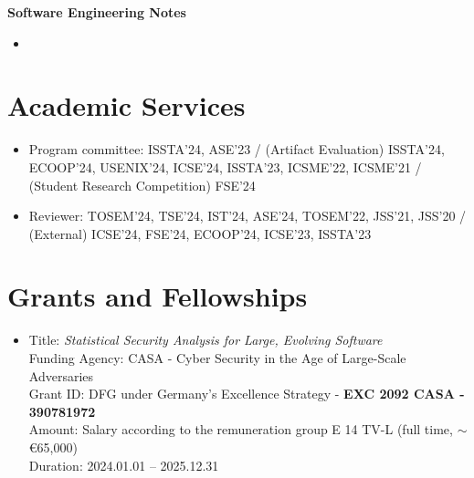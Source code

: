 \documentclass[letterpaper,11pt]{article}
\begin{document}
\textbf{Software Engineering Notes}\vspace{-4pt}
\begin{itemize}
  \item {}
\end{itemize}

\section{Academic Services}
\begin{itemize}
  
  \item Program committee: ISSTA'24, ASE'23 / (Artifact Evaluation) ISSTA'24, ECOOP'24, USENIX'24, ICSE'24, ISSTA'23, ICSME'22, ICSME'21 / (Student Research Competition) FSE'24
  \item Reviewer: TOSEM'24, TSE'24, IST'24, ASE'24, TOSEM'22, JSS'21, JSS'20  / (External) ICSE'24, FSE'24, ECOOP'24, ICSE'23, ISSTA'23
\end{itemize}

\section{Grants and Fellowships}
\begin{itemize}
  \item Title: \emph{Statistical Security Analysis for Large, Evolving Software} \\ 
  Funding Agency: CASA - Cyber Security in the Age of Large-Scale Adversaries \\ 
  Grant ID: DFG under Germany's Excellence Strategy - \textbf{EXC 2092 CASA - 390781972} \\ 
  Amount: Salary according to the remuneration group E 14 TV-L (full time, $\sim$ \euro{65,000}) \\
  Duration: 2024.01.01 -- 2025.12.31
\end{itemize}
\end{document}
